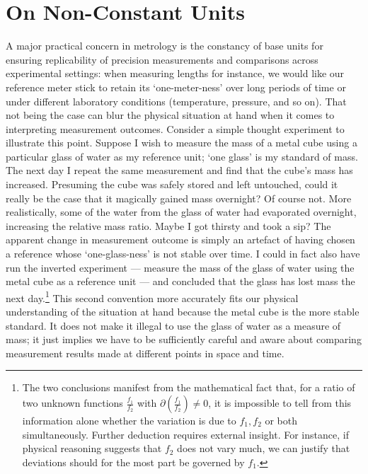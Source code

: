 \documentclass[12pt]{article}
\numberwithin{equation}{section}
\begin{document}
\section{On Non-Constant Units}\label{sec:nonconstant}
A major practical concern in metrology is the constancy of base units for ensuring replicability of precision measurements and comparisons across experimental settings: when measuring lengths for instance, we would like our reference meter stick to retain its `one-meter-ness' over long periods of time or under different laboratory conditions (temperature, pressure, and so on). That not being the case can blur the physical situation at hand when it comes to interpreting measurement outcomes. Consider a simple thought experiment to illustrate this point. Suppose I wish to measure the mass of a metal cube using a particular glass of water as my reference unit; `one glass' is my standard of mass. The next day I repeat the same measurement and find that the cube's mass has increased. Presuming the cube was safely stored and left untouched, could it really be the case that it magically gained mass overnight? Of course not. More realistically, some of the water from the glass of water had evaporated overnight, increasing the relative mass ratio. Maybe I got thirsty and took a sip? The apparent change in measurement outcome is simply an artefact of having chosen a reference whose `one-glass-ness' is not stable over time. I could in fact also have run the inverted experiment --- measure the mass of the glass of water using the metal cube as a reference unit --- and concluded that the glass has lost mass the next day.\footnote{The two conclusions manifest from the mathematical fact that, for a ratio of two unknown functions $\frac{f_1}{f_2}$ with $\partial(\frac{f_1}{f_2}) \neq 0$, it is impossible to tell from this information alone whether the variation is due to $f_1,f_2$ or both simultaneously. Further deduction requires external insight. For instance, if physical reasoning suggests that $f_2$ does not vary much, we can justify that deviations should for the most part be governed by $f_1$.} This second convention more accurately fits our physical understanding of the situation at hand because the metal cube is the more stable standard. It does not make it illegal to use the glass of water as a measure of mass; it just implies we have to be sufficiently careful and aware about comparing measurement results made at different points in space and time.
\end{document}
